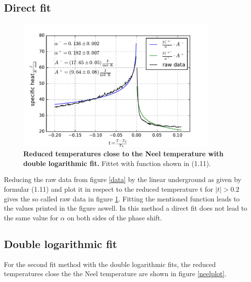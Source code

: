 \documentclass{include/thesisclass3}
\begin{document}
\subsection{Direct fit}
\begin{figure}[H]
\includegraphics[width = 0.9\textwidth]{fig/specheat_j.pdf}
\caption{\label{specH}\textbf{Reduced temperatures close to the Neel temperature with double logarithmic fit.} Fittet with function shown in (1.11).}  
\end{figure}
Reducing the raw data from figure \ref{data} by the linear underground as given by formular (1.11) and plot it in respect to the reduced temperature t for $|t|> 0.2$ gives the so called raw data in figure \ref{specH}. Fitting the mentioned function leads to the values printed in the figure aswell.
In this method a direct fit does not lead to the same value for $\alpha$ on both sides of the phase shift.
\subsection{Double logarithmic fit}
For the second fit method with the double logarithmic fits, the reduced temperatures close the the Neel temperature are shown in figure \ref{neelplot}.
\end{document}
